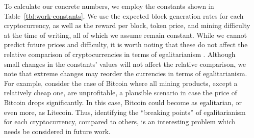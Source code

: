 To calculate our concrete numbers, we employ the constants shown in
Table~\ref{tbl:work-constants}. We use the expected block generation rates for
each cryptocurrency, as well as the reward per block, token price, and mining
difficulty at the time of writing, all of which we assume remain constant.
While we cannot predict future prices and difficulty, it is worth noting that
these do not affect the relative comparison of cryptocurrencies in terms of
egalitarianism .  Although small
changes in the constants' values will not affect the relative comparison, we
note that extreme changes may reorder the currencies in terms of
egalitarianism. For example, consider the case of Bitcoin where all mining
products, except a relatively cheap one, are unprofitable, a plausible scenario
in case \eg the price of Bitcoin drops significantly. In this case, Bitcoin
could become as egalitarian, or even more, as \eg Litecoin. Thus, identifying
the ``breaking points'' of egalitarianism for each cryptocurrency, compared to
others, is an interesting problem which needs be considered in future work.

\begin{table}
  \centering
  \caption{The parameters to our proof-of-work mining simulations. Some depend on the cryptocurrency $c$.}
  \label{tbl:work-constants}
\end{table}

